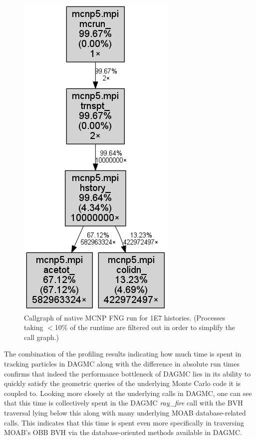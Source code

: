 \documentclass[12pt, a4paper]{article}
\begin{document}
\begin{figure}[H]
  \centering
  \caption{Callgraph of native MCNP FNG run for 1E7 histories. (Processes taking $<$10\% of the runtime are filtered out in order to simplify the call graph.)}
  \label{mcnp-fng-coarse}
  \includegraphics[scale=0.35]{native_fng_cg_coarse.png}
\end{figure}

The combination of the profiling results indicating how much time is spent in tracking particles in DAGMC along with the difference in absolute run times confirms that indeed the performance bottleneck of DAGMC lies in its ability to quickly satisfy the geometric queries of the underlying Monte Carlo code it is coupled to. Looking more closely at the underlying calls in DAGMC, one can see that this time is collectively spent in the DAGMC \textit{ray\_fire} call with the BVH traversal lying below this along with many underlying MOAB database-related calls. This indicates that this time is spent even more specifically in traversing MOAB's OBB BVH via the database-oriented methods available in DAGMC.
\end{document}
